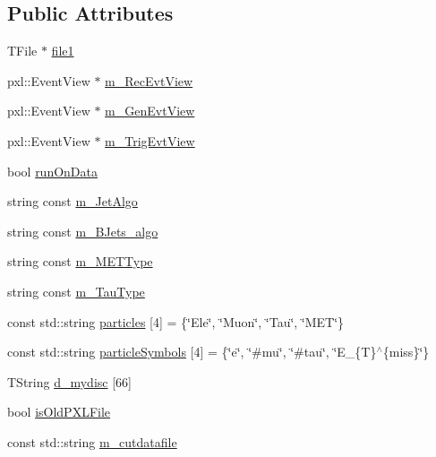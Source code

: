 \subsection*{Public Attributes}
\begin{DoxyCompactItemize}
\item 
T\-File $\ast$ \hyperlink{classspecialAna_a926d4b22d2a4c69f67ad9a2708ae96a0}{file1}
\item 
pxl\-::\-Event\-View $\ast$ \hyperlink{classspecialAna_a7544fa663090f43e35ff6c8594884c37}{m\-\_\-\-Rec\-Evt\-View}
\item 
pxl\-::\-Event\-View $\ast$ \hyperlink{classspecialAna_a68771d0c3f87434532645d27d5c2316b}{m\-\_\-\-Gen\-Evt\-View}
\item 
pxl\-::\-Event\-View $\ast$ \hyperlink{classspecialAna_aaacff41e1aa1c73726d348ead1319c2e}{m\-\_\-\-Trig\-Evt\-View}
\item 
bool \hyperlink{classspecialAna_aad40cb68a6bfb77e015fd348b620fa4a}{run\-On\-Data}
\item 
string const \hyperlink{classspecialAna_a7ac446797f2e7984a748e887709870c3}{m\-\_\-\-Jet\-Algo}
\item 
string const \hyperlink{classspecialAna_adf4b91d17a05add2c475bad5ab72d414}{m\-\_\-\-B\-Jets\-\_\-algo}
\item 
string const \hyperlink{classspecialAna_a3463aa545f96fc9a4ae14b82aadb01c6}{m\-\_\-\-M\-E\-T\-Type}
\item 
string const \hyperlink{classspecialAna_a928cc6c577c7d2a9df708f038c7b7b2f}{m\-\_\-\-Tau\-Type}
\item 
const std\-::string \hyperlink{classspecialAna_a68eaaa795a5c08f7505d44b51361b224}{particles} \mbox{[}4\mbox{]} = \{\char`\"{}Ele\char`\"{}, \char`\"{}Muon\char`\"{}, \char`\"{}Tau\char`\"{}, \char`\"{}M\-E\-T\char`\"{}\}
\item 
const std\-::string \hyperlink{classspecialAna_a5500b6ed6706afbab4721747b9a475c8}{particle\-Symbols} \mbox{[}4\mbox{]} = \{\char`\"{}e\char`\"{}, \char`\"{}\#mu\char`\"{}, \char`\"{}\#tau\char`\"{}, \char`\"{}E\-\_\-\{T\}$^\wedge$\{miss\}\char`\"{}\}
\item 
T\-String \hyperlink{classspecialAna_a6b83298c41f32cdbd7979ec8033eefd6}{d\-\_\-mydisc} \mbox{[}66\mbox{]}
\item 
bool \hyperlink{classspecialAna_add184c9cd673ecf710b3801749931b03}{is\-Old\-P\-X\-L\-File}
\item 
const std\-::string \hyperlink{classspecialAna_aac185c43fcd3fbaa8b869fb8bdba8b42}{m\-\_\-cutdatafile}
\item 

\end{DoxyCompactItemize}
